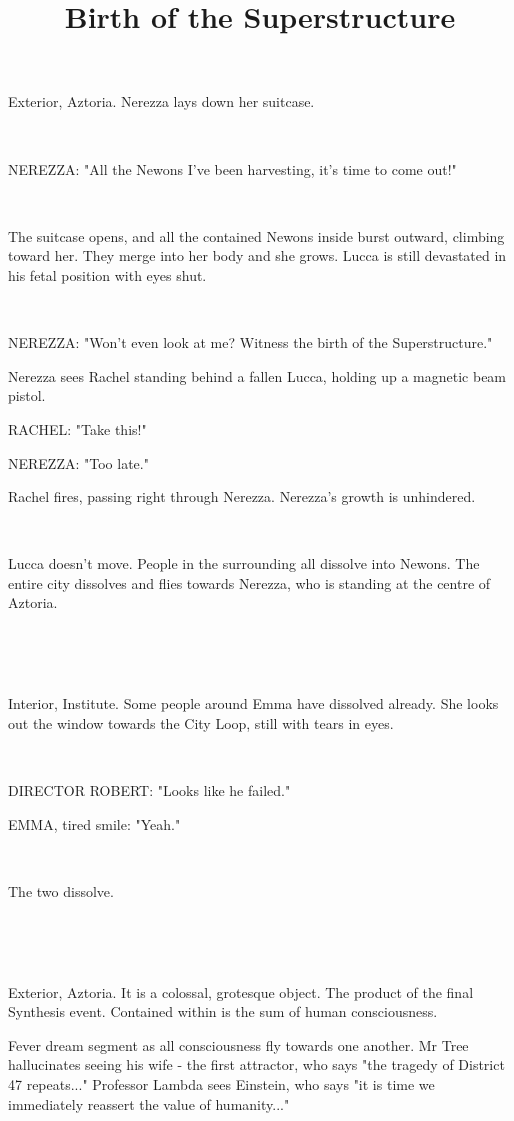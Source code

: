 \documentclass[11pt]{article}
\begin{document}
\ttfamily
\title{Birth of the Superstructure}
\maketitle


Exterior, Aztoria. 
Nerezza lays down her suitcase. 

\ 

NEREZZA: "All the Newons I've been harvesting, it's time to come out!"

\ 

The suitcase opens, and all the contained Newons inside burst outward, climbing toward her.
They merge into her body and she grows.
Lucca is still devastated in his fetal position with eyes shut.

\ 

NEREZZA: "Won't even look at me?
Witness the birth of the Superstructure."

Nerezza sees Rachel standing behind a fallen Lucca, holding up a magnetic beam pistol.

RACHEL: "Take this!"

NEREZZA: "Too late."

Rachel fires, passing right through Nerezza. 
Nerezza's growth is unhindered.

\ 

Lucca doesn't move. 
People in the surrounding all dissolve into Newons.
The entire city dissolves and flies towards Nerezza, who is standing at the centre of Aztoria. 

\ 

\ 

Interior, Institute.
Some people around Emma have dissolved already.
She looks out the window towards the City Loop, still with tears in eyes.

\ 

DIRECTOR ROBERT: "Looks like he failed."

EMMA, tired smile: "Yeah."

\ 

The two dissolve.

\ 

\ 

Exterior, Aztoria.
It is a colossal, grotesque object.
The product of the final Synthesis event.
Contained within is the sum of human consciousness.

Fever dream segment as all consciousness fly towards one another.
Mr Tree hallucinates seeing his wife - the first attractor, who says "the tragedy of District 47 repeats..."
Professor Lambda sees Einstein, who says "it is time we immediately reassert the value of humanity..."
\end{document}
